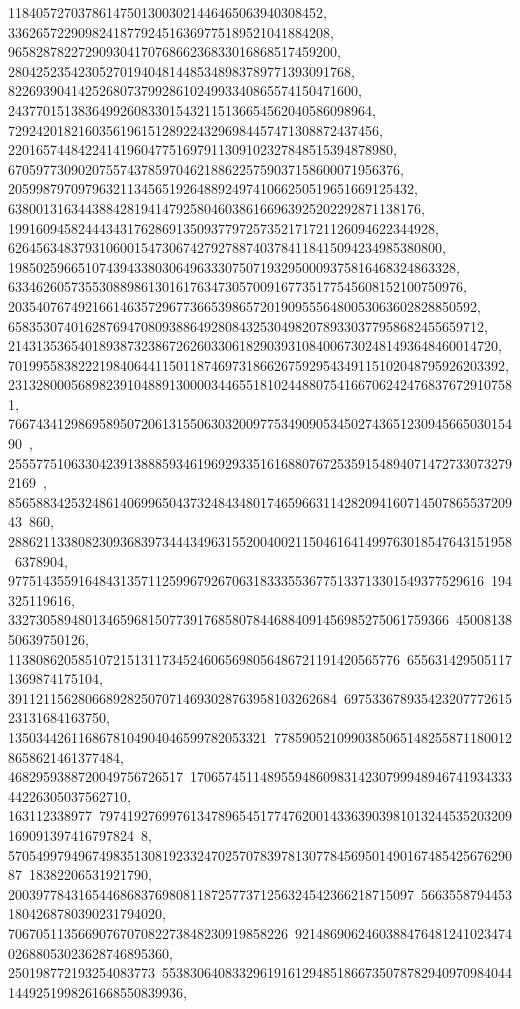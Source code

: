 {{{   118405727037861475013003021446465063940308452, 
   3362657229098241877924516369775189521041884208, 
   96582878227290930417076866236833016868517459200, 
   2804252354230527019404814485348983789771393091768, 
   82269390414252680737992861024993340865574150471600, 
   2437701513836499260833015432115136654562040586098964, 
   72924201821603561961512892243296984457471308872437456, 
   2201657448422414196047751697911309102327848515394878980, 
   67059773090207557437859704621886225759037158600071956376, 
   2059987970979632113456519264889249741066250519651669125432, 
   63800131634438842819414792580460386166963925202292871138176, 
   1991609458244434317628691350937797257352171721126094622344928, 
   62645634837931060015473067427927887403784118415094234985380800, 
   1985025966510743943380306496333075071932950009375816468324863328, 
   63346260573553088986130161763473057009167735177545608152100750976, 
   2035407674921661463572967736653986572019095556480053063602828850592, 
   65835307401628769470809388649280843253049820789330377958682455659712, 
   2143135365401893873238672626033061829039310840067302481493648460014720, 
   70199558382221984064411501187469731866267592954349115102048795926203392, 
   2313280005689823910488913000034465518102448807541667062424768376729107581, 
   76674341298695895072061315506303200977534909053450274365123094566503015490\
, 
   2555775106330423913888593461969293351616880767253591548940714727330732792169\
, 
   85658834253248614069965043732484348017465966311428209416071450786553720943\
860, 288621133808230936839734443496315520040021150461641499763018547643151958\
6378904, 97751435591648431357112599679267063183335536775133713301549377529616\
194325119616, 332730589480134659681507739176858078446884091456985275061759366\
4500813850639750126, 11380862058510721513117345246065698056486721191420565776\
6556314295051171369874175104, 39112115628066892825070714693028763958103262684\
69753367893542320777261523131684163750, 1350344261168678104904046599782053321\
77859052109903850651482558711800128658621461377484, 4682959388720049756726517\
170657451148955948609831423079994894674193433344226305037562710, 163112338977\
79741927699761347896545177476200143363903981013244535203209169091397416797824\
8, 57054997949674983513081923324702570783978130778456950149016748542567629087\
18382206531921790, 2003977843165446868376980811872577371256324542366218715097\
56635587944531804268780390231794020, 7067051135669076707082273848230919858226\
921486906246038847648124102347402688053023628746895360, 250198772193254083773\
553830640833296191612948518667350787829409709840441449251998261668550839936, 
}}}
